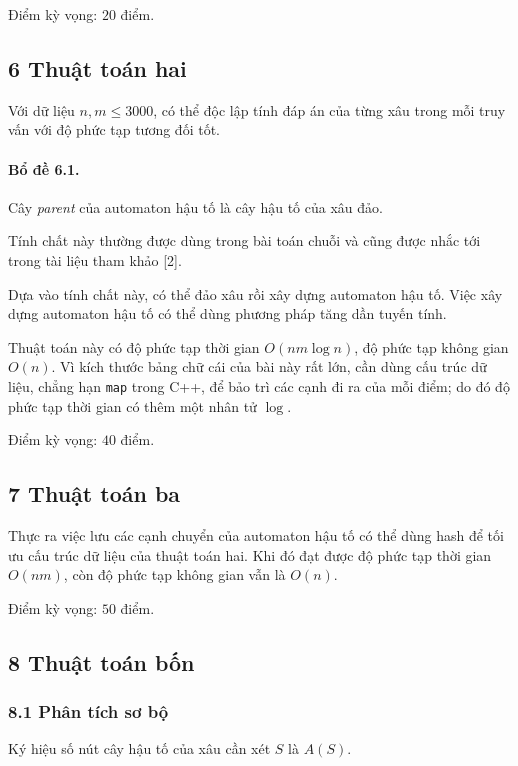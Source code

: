 \documentclass[11pt]{article}
\begin{document}
Điểm kỳ vọng: \(20\) điểm.

\subsection*{6 Thuật toán hai}

Với dữ liệu \(n,m\le 3000\), có thể độc lập tính đáp án của từng xâu trong mỗi
truy vấn với độ phức tạp tương đối tốt.

\paragraph{Bổ đề 6.1.} Cây \emph{parent} của automaton hậu tố là cây hậu tố của
xâu đảo.

Tính chất này thường được dùng trong bài toán chuỗi và cũng được nhắc tới trong
tài liệu tham khảo [2].

Dựa vào tính chất này, có thể đảo xâu rồi xây dựng automaton hậu tố. Việc xây
dựng automaton hậu tố có thể dùng phương pháp tăng dần tuyến tính.

Thuật toán này có độ phức tạp thời gian \(O(nm\log n)\), độ phức tạp không gian
\(O(n)\). Vì kích thước bảng chữ cái của bài này rất lớn, cần dùng cấu trúc dữ
liệu, chẳng hạn \texttt{map} trong C++, để bảo trì các cạnh đi ra của mỗi điểm;
do đó độ phức tạp thời gian có thêm một nhân tử \(\log\).

Điểm kỳ vọng: \(40\) điểm.

\subsection*{7 Thuật toán ba}

Thực ra việc lưu các cạnh chuyển của automaton hậu tố có thể dùng hash để tối
ưu cấu trúc dữ liệu của thuật toán hai. Khi đó đạt được độ phức tạp thời gian
\(O(nm)\), còn độ phức tạp không gian vẫn là \(O(n)\).

Điểm kỳ vọng: \(50\) điểm.

\subsection*{8 Thuật toán bốn}

\subsubsection*{8.1 Phân tích sơ bộ}

Ký hiệu số nút cây hậu tố của xâu cần xét \(S\) là \(A(S)\).
\end{document}
